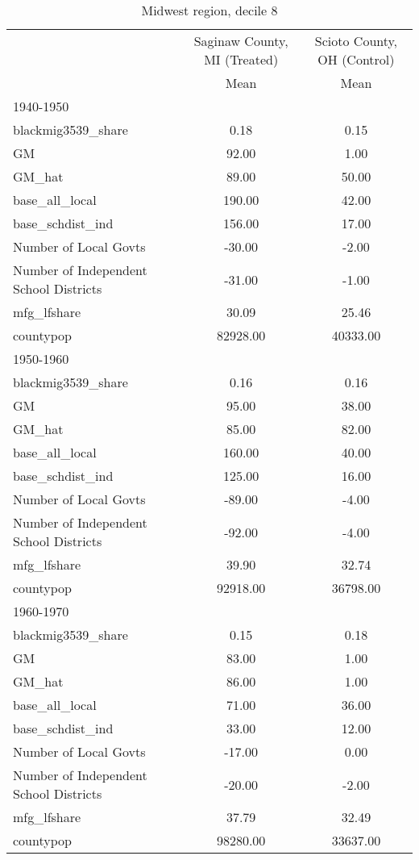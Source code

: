 \begin{table}[htbp]\centering
\def\sym#1{\ifmmode^{#1}\else\(^{#1}\)\fi}
\caption{Midwest region, decile 8 \label{tab1}}
\begin{tabular}{l*{2}{c}}
\toprule
                    &\multicolumn{1}{c}{Saginaw County, MI (Treated)}&\multicolumn{1}{c}{Scioto County, OH (Control)}\\
                    &        Mean&        Mean\\
\midrule
1940-1950           &            &            \\
blackmig3539\_share  &        0.18&        0.15\\
GM                  &       92.00&        1.00\\
GM\_hat              &       89.00&       50.00\\
base\_all\_local      &      190.00&       42.00\\
base\_schdist\_ind    &      156.00&       17.00\\
Number of Local Govts&      -30.00&       -2.00\\
Number of Independent School Districts&      -31.00&       -1.00\\
mfg\_lfshare         &       30.09&       25.46\\
countypop           &    82928.00&    40333.00\\
\midrule
1950-1960           &            &            \\
blackmig3539\_share  &        0.16&        0.16\\
GM                  &       95.00&       38.00\\
GM\_hat              &       85.00&       82.00\\
base\_all\_local      &      160.00&       40.00\\
base\_schdist\_ind    &      125.00&       16.00\\
Number of Local Govts&      -89.00&       -4.00\\
Number of Independent School Districts&      -92.00&       -4.00\\
mfg\_lfshare         &       39.90&       32.74\\
countypop           &    92918.00&    36798.00\\
\midrule
1960-1970           &            &            \\
blackmig3539\_share  &        0.15&        0.18\\
GM                  &       83.00&        1.00\\
GM\_hat              &       86.00&        1.00\\
base\_all\_local      &       71.00&       36.00\\
base\_schdist\_ind    &       33.00&       12.00\\
Number of Local Govts&      -17.00&        0.00\\
Number of Independent School Districts&      -20.00&       -2.00\\
mfg\_lfshare         &       37.79&       32.49\\
countypop           &    98280.00&    33637.00\\
\bottomrule
\end{tabular}
\end{table}
